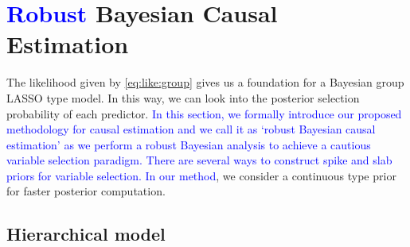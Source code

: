\documentclass[preprint,12pt]{elsarticle}
\newcommand{\added}[1]{\textcolor{blue}{#1}}
\begin{document}
\section{\added{Robust} Bayesian Causal Estimation}\label{sec:bayes}

The likelihood given by \cref{eq:like:group} gives us
a foundation for a Bayesian group LASSO 
\citep{xu2015} type model. In this way, we can look into the posterior selection
probability of each predictor. \added{In this section, we formally introduce our
	proposed methodology for causal estimation and we call it as
	`robust Bayesian causal estimation' as we perform a robust
	Bayesian analysis \citep{BERGER1990303} to achieve a cautious
	variable selection paradigm. There are several
ways to construct spike and slab priors for
variable selection. In our method}, we consider a continuous type
prior \citep{basu2023robust,ishwaran2005} for faster posterior
computation.


\subsection{Hierarchical model}
\end{document}
